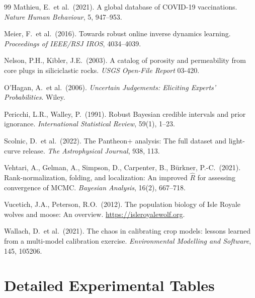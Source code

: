 \documentclass[11pt,a4paper]{article}
\begin{document}
\begin{thebibliography}{99}
Mathieu, E.\ et al.\ (2021).
A global database of COVID-19 vaccinations.
\textit{Nature Human Behaviour}, 5, 947--953.

Meier, F.\ et al.\ (2016).
Towards robust online inverse dynamics learning.
\textit{Proceedings of IEEE/RSJ IROS}, 4034--4039.

Nelson, P.H., Kibler, J.E.\ (2003).
A catalog of porosity and permeability from core plugs in siliciclastic rocks.
\textit{USGS Open-File Report} 03-420.

O'Hagan, A.\ et al.\ (2006).
\textit{Uncertain Judgements: Eliciting Experts' Probabilities}.
Wiley.

Pericchi, L.R., Walley, P.\ (1991).
Robust Bayesian credible intervals and prior ignorance.
\textit{International Statistical Review}, 59(1), 1--23.

Scolnic, D.\ et al.\ (2022).
The Pantheon+ analysis: The full dataset and light-curve release.
\textit{The Astrophysical Journal}, 938, 113.

Vehtari, A., Gelman, A., Simpson, D., Carpenter, B., B\"urkner, P.-C.\ (2021).
Rank-normalization, folding, and localization: An improved $\hat{R}$ for assessing convergence
of MCMC.
\textit{Bayesian Analysis}, 16(2), 667--718.

Vucetich, J.A., Peterson, R.O.\ (2012).
The population biology of Isle Royale wolves and moose: An overview.
\url{https://isleroyalewolf.org}.

Wallach, D.\ et al.\ (2021).
The chaos in calibrating crop models: lessons learned from a multi-model calibration exercise.
\textit{Environmental Modelling and Software}, 145, 105206.

\end{thebibliography}

\newpage
\appendix
\section{Detailed Experimental Tables}
\label{app:tables}
\end{document}
